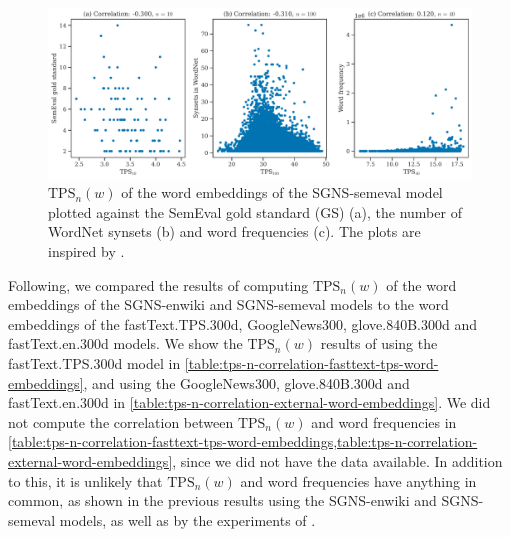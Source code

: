 \begin{figure}[H]
    \centering
    \includegraphics[width=\textwidth]{thesis/figures/tps-n-correlation-sgns-semeval_2010_task_14.pdf}
    \caption{$\text{TPS}_n(w)$ of the word embeddings of the SGNS-semeval model plotted against the SemEval gold standard (GS) (a), the number of WordNet synsets (b) and word frequencies (c). The plots are inspired by \cite[Figures 8 and 9]{jakubowski2020topology}.}
    \label{fig:tps-n-correlation-sgns-semeval}
\end{figure}

Following, we compared the results of computing $\text{TPS}_n(w)$ of the word embeddings of the SGNS-enwiki and SGNS-semeval models to the word embeddings of the fastText.TPS.300d, GoogleNews300, glove.840B.300d and fastText.en.300d models. We show the $\text{TPS}_n(w)$ results of using the fastText.TPS.300d model in \cref{table:tps-n-correlation-fasttext-tps-word-embeddings}, and using the GoogleNews300, glove.840B.300d and fastText.en.300d in \cref{table:tps-n-correlation-external-word-embeddings}. We did not compute the correlation between $\text{TPS}_n(w)$ and word frequencies in \cref{table:tps-n-correlation-fasttext-tps-word-embeddings,table:tps-n-correlation-external-word-embeddings}, since we did not have the data available. In addition to this, it is unlikely that $\text{TPS}_n(w)$ and word frequencies have anything in common, as shown in the previous results using the SGNS-enwiki and SGNS-semeval models, as well as by the experiments of \cite{jakubowski2020topology}.

